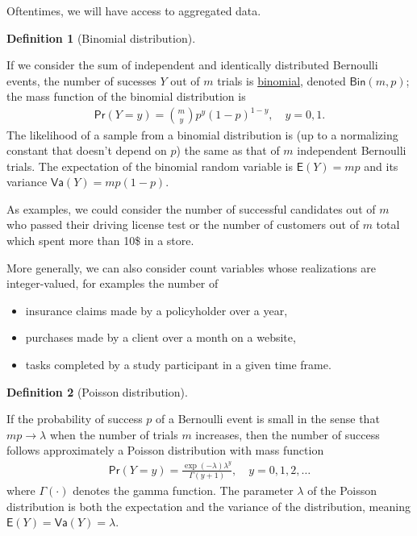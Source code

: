 \documentclass[
  11pt,
  letterpaper,
]{scrbook}
\providecommand{\tightlist}{%
  \setlength{\itemsep}{0pt}\setlength{\parskip}{0pt}}\usepackage{longtable,booktabs,array}
\theoremstyle{definition}
\newtheorem{definition}{Definition}[chapter]
\theoremstyle{definition}
\theoremstyle{plain}
\theoremstyle{plain}
\theoremstyle{remark}
\begin{document}
Oftentimes, we will have access to aggregated data.

\begin{definition}[Binomial
distribution]\protect\hypertarget{def-binomialdist}{}\label{def-binomialdist}

If we consider the sum of independent and identically distributed
Bernoulli events, the number of sucesses \(Y\) out of \(m\) trials is
\href{https://en.wikipedia.org/wiki/Binomial_distribution}{binomial},
denoted \(\mathsf{Bin}(m, p)\); the mass function of the binomial
distribution is \begin{align*}
\mathsf{Pr}(Y=y) = \binom{m}{y}p^y (1-p)^{1-y}, \quad y=0, 1.
\end{align*} The likelihood of a sample from a binomial distribution is
(up to a normalizing constant that doesn't depend on \(p\)) the same as
that of \(m\) independent Bernoulli trials. The expectation of the
binomial random variable is \(\mathsf{E}(Y)=mp\) and its variance
\(\mathsf{Va}(Y)=mp(1-p).\)

\end{definition}

As examples, we could consider the number of successful candidates out
of \(m\) who passed their driving license test or the number of
customers out of \(m\) total which spent more than 10\$ in a store.

More generally, we can also consider count variables whose realizations
are integer-valued, for examples the number of

\begin{itemize}
\tightlist
\item
  insurance claims made by a policyholder over a year,
\item
  purchases made by a client over a month on a website,
\item
  tasks completed by a study participant in a given time frame.
\end{itemize}

\begin{definition}[Poisson
distribution]\protect\hypertarget{def-poissondist}{}\label{def-poissondist}

If the probability of success \(p\) of a Bernoulli event is small in the
sense that \(mp \to \lambda\) when the number of trials \(m\) increases,
then the number of success follows approximately a Poisson distribution
with mass function \begin{align*}
\mathsf{Pr}(Y=y) = \frac{\exp(-\lambda)\lambda^y}{\Gamma(y+1)}, \quad y=0, 1, 2, \ldots
\end{align*} where \(\Gamma(\cdot)\) denotes the gamma function. The
parameter \(\lambda\) of the Poisson distribution is both the
expectation and the variance of the distribution, meaning
\(\mathsf{E}(Y)=\mathsf{Va}(Y)=\lambda.\)

\end{definition}
\end{document}
